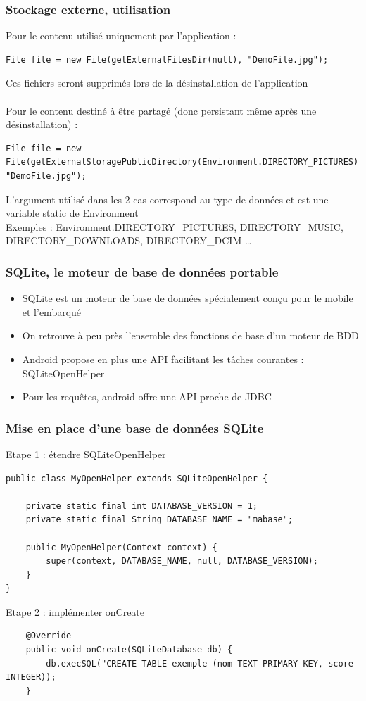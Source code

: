 \documentclass{beamer}
\begin{document}
\begin{frame}[fragile]
\frametitle{Stockage externe, utilisation}
Pour le contenu utilisé uniquement par l'application :
\begin{lstlisting}
File file = new File(getExternalFilesDir(null), "DemoFile.jpg");
\end{lstlisting}
Ces fichiers seront supprimés lors de la désinstallation de l'application\\\\
Pour le contenu destiné à être partagé (donc persistant même après une
désinstallation) :
\begin{lstlisting}
File file = new File(getExternalStoragePublicDirectory(Environment.DIRECTORY_PICTURES), "DemoFile.jpg");
\end{lstlisting}
L'argument utilisé dans les 2 cas correspond au type de données et est une variable static de Environment\\
Exemples : Environment.DIRECTORY\_PICTURES, DIRECTORY\_MUSIC, DIRECTORY\_DOWNLOADS, DIRECTORY\_DCIM \ldots
\end{frame}
\begin{frame}[fragile]
\frametitle{SQLite, le moteur de base de données portable}
\begin{itemize}
    \item SQLite est un moteur de base de données spécialement conçu pour le
    mobile et l'embarqué
    \item On retrouve à peu près l'ensemble des fonctions de base d'un moteur de BDD
    \item Android propose en plus une API facilitant les tâches courantes : SQLiteOpenHelper
    \item Pour les requêtes, android offre une API proche de JDBC
\end{itemize}
\end{frame}
\begin{frame}[fragile]
\frametitle{Mise en place d'une base de données SQLite}
Etape 1 : étendre SQLiteOpenHelper 
\begin{lstlisting}
public class MyOpenHelper extends SQLiteOpenHelper {

    private static final int DATABASE_VERSION = 1;
    private static final String DATABASE_NAME = "mabase";

    public MyOpenHelper(Context context) {
        super(context, DATABASE_NAME, null, DATABASE_VERSION);
    }
}
\end{lstlisting}
Etape 2 : implémenter onCreate
\begin{lstlisting}
    @Override
    public void onCreate(SQLiteDatabase db) {
        db.execSQL("CREATE TABLE exemple (nom TEXT PRIMARY KEY, score INTEGER));
    }
\end{lstlisting}
\end{frame}
\end{document}
